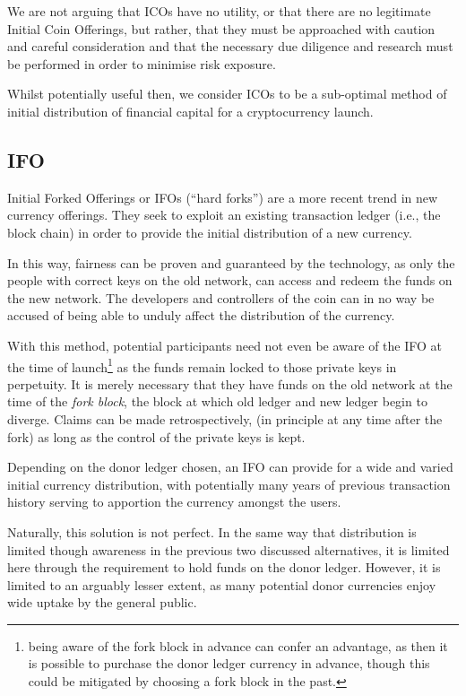 \documentclass{IOS-Book-Article}
\begin{document}
We are not arguing that ICOs have no utility, or that there are no legitimate
Initial Coin Offerings, but rather, that they must be approached with caution and 
careful consideration and that the necessary due diligence and research must
be performed in order to minimise risk exposure.

Whilst potentially useful then, we consider ICOs to be a sub-optimal
method of initial distribution of financial capital for a cryptocurrency launch.


\subsection{IFO}

Initial Forked Offerings or IFOs (``hard forks'') are a more recent trend in
new currency offerings. They seek to exploit an existing transaction ledger (i.e., the block chain) 
in order to provide the initial distribution of a new currency. 

In this way, fairness can be proven and guaranteed by the technology, as only the people 
with correct keys on the old network, can access and redeem the funds on the new network.
The developers and controllers of the coin can in no way be accused of being able to unduly
affect the distribution of the currency.

With this method, potential participants need not even be aware of the IFO at the time of
launch\footnote{being aware of the fork block in advance can confer an advantage, as then it is possible to 
purchase the donor ledger currency in advance, though this could be mitigated by choosing a fork block 
in the past.} as the funds remain locked to those private keys in perpetuity. It is merely necessary that
they have funds on the old network at the time of the \textit{fork block}, the block at which
old ledger and new ledger begin to diverge. Claims can be made retrospectively, (in principle at any time
after the fork) as long as the control of the private keys is kept.

Depending on the donor ledger chosen, an IFO can provide for a wide and varied
initial currency distribution, with potentially many years of previous transaction
history serving to apportion the currency amongst the users.

Naturally, this solution is not perfect. In the same way that distribution is limited though awareness
in the previous two discussed alternatives, it is limited here through the requirement to hold funds
on the donor ledger. However, it is limited to an arguably lesser 
extent, as many potential donor currencies enjoy wide uptake by the general public.
\end{document}
